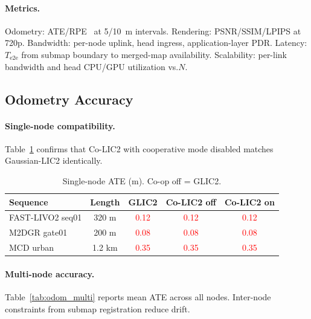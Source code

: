 \paragraph{Metrics.} Odometry: ATE/RPE~\cite{zhang2018tum} at 5/10~m intervals.
Rendering: PSNR/SSIM/LPIPS at 720p. Bandwidth: per-node uplink, head ingress,
application-layer PDR. Latency: $T_{\text{e2e}}$ from submap boundary to
merged-map availability. Scalability: per-link bandwidth and head CPU/GPU
utilization vs.\@ $N$.

\subsection{Odometry Accuracy}

\paragraph{Single-node compatibility.} Table~\ref{tab:odom_single} confirms
that Co-LIC2 with cooperative mode disabled matches Gaussian-LIC2 identically.

\begin{table}[t]
  \centering
  \caption{Single-node ATE (m). Co-op off = GLIC2.}
  \label{tab:odom_single}
  \footnotesize
  \setlength{\tabcolsep}{4pt}
  \begin{tabular}{@{}lcccc@{}}
    \toprule
    Sequence & Length & GLIC2 & Co-LIC2 off & Co-LIC2 on \\
    \midrule
    FAST-LIVO2 seq01 & 320 m & \textcolor{red}{0.12} & \textcolor{red}{0.12} & \textcolor{red}{0.12} \\
    M2DGR gate01     & 200 m & \textcolor{red}{0.08} & \textcolor{red}{0.08} & \textcolor{red}{0.08} \\
    MCD urban        & 1.2 km& \textcolor{red}{0.35} & \textcolor{red}{0.35} & \textcolor{red}{0.35} \\
    \bottomrule
  \end{tabular}
\end{table}

\paragraph{Multi-node accuracy.} Table~\ref{tab:odom_multi} reports mean ATE
across all nodes. Inter-node constraints from submap registration reduce drift.

